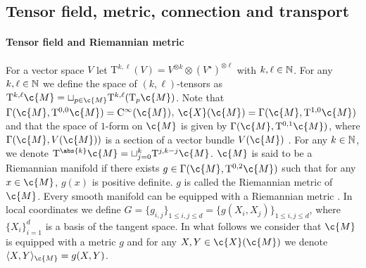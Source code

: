 \subsection{Tensor field, metric, connection and transport}
\label{sec:metr-conn-tens}

\paragraph{Tensor field and Riemannian metric}

For a vector space \(V\) let \(\mathrm{T}^{k, \ell}(V) = V^{\otimes k} \otimes (V^\star)^{\otimes \ell}\) with \(k, \ell \in \mathbb{N}\).
For any \(k, \ell \in \mathbb{N}\) we define the space of \((k,\ell)\)-tensors as \(\mathrm{T}^{k,\ell} \c{M} = \sqcup_{p \in \c{M}} \mathrm{T}^{k,\ell}(\mathrm{T}_p\c{M})\).
Note that \(\Gamma(\c{M}, \mathrm{T}^{0,0}\c{M}) = \mathrm{C}^\infty(\c{M})\), \(\c{X}(\c{M}) = \Gamma(\c{M}, \mathrm{T}^{1,0} \c{M})\) and that the space of \(1\)-form on \(\c{M}\) is given by \(\Gamma(\c{M}, \mathrm{T}^{0,1} \c{M})\), where \(\Gamma(\c{M}, V(\c{M}))\) is a section of a vector bundle \(V(\c{M})\) \parencite[see][Chapter 10]{lee2013smooth}.
For any \(k \in \mathbb{N}\), we denote \(\mathrm{T}^{\abs{k}} \c{M} = \sqcup_{j=0}^k \mathrm{T}^{j,k-j} \c{M}\).
\(\c{M}\) is said to be
a Riemannian manifold if there exists \(g \in \Gamma(\c{M}, \mathrm{T}^{0,2} \c{M})\) such that for
any \(x \in \c{M}\), \(g(x)\) is positive definite. \(g\) is called the Riemannian metric
of \(\c{M}\).
Every smooth manifold can be equipped with a Riemannian metric \cite[see][Proposition 2.4]{lee2018introduction}.
In local coordinates we define \(G = \{g_{i,j}\}_{1 \leq i,j \leq d} = \{g(X_i, X_j)\}_{1 \leq i,j \leq d}\), where \(\{X_i\}_{i=1}^d\) is a basis of the tangent space.
In what follows we consider that \(\c{M}\) is equipped with a metric \(g\) and for any \(X, Y \in \c{X}(\c{M})\) we denote \(\langle X,Y \rangle_{\c{M}} = g(X,Y)\).

